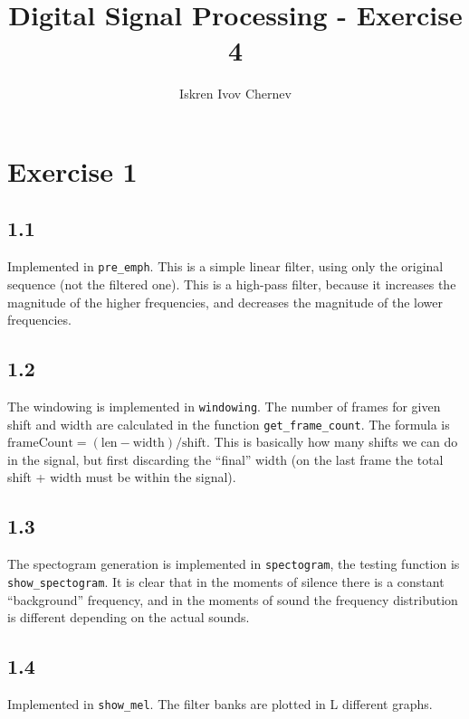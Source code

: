 \documentclass[a4paper]{article}
\begin{document}
\title{Digital Signal Processing - Exercise 4}
\author{Iskren Ivov Chernev}
\maketitle


\section*{Exercise 1}

\subsection*{1.1}

Implemented in \texttt{pre\_emph}. This is a simple linear filter, using only
the original sequence (not the filtered one). This is a high-pass filter,
because it increases the magnitude of the higher frequencies, and decreases the
magnitude of the lower frequencies.

\subsection*{1.2}

The windowing is implemented in \texttt{windowing}. The number of frames for
given shift and width are calculated in the function
\texttt{get\_frame\_count}. The formula is $ \mathrm{frameCount}
= (\mathrm{len} - \mathrm{width}) / \mathrm{shift} $. This is basically how
many shifts we can do in the signal, but first discarding the ``final'' width
(on the last frame the total shift + width must be within the signal).

\subsection*{1.3}

The spectogram generation is implemented in \texttt{spectogram}, the testing
function is \texttt{show\_spectogram}. It is clear that in the moments of
silence there is a constant ``background'' frequency, and in the moments of
sound the frequency distribution is different depending on the actual sounds.

\subsection*{1.4}

Implemented in \texttt{show\_mel}. The filter banks are plotted in L different
graphs.
\end{document}
